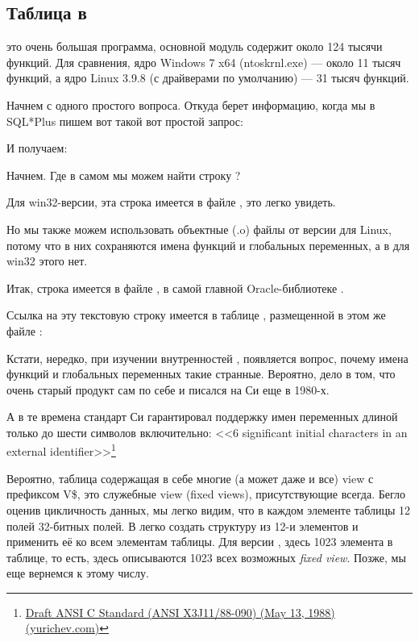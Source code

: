 \subsection{Таблица  в \oracle}

\myindex{\oracle}
 это очень большая программа, основной модуль  содержит около 124 тысячи функций. Для сравнения, ядро Windows 7 x64 (ntoskrnl.exe) --- около 11 тысяч функций, а ядро Linux 3.9.8 (с драйверами по умолчанию) --- 31 тысяч функций.

Начнем с одного простого вопроса. Откуда \oracle берет информацию, когда мы в SQL*Plus пишем вот такой вот простой запрос:



И получаем:



Начнем. Где в самом \oracle мы можем найти строку ?

Для win32-версии, эта строка имеется в файле , это легко увидеть.

Но мы также можем использовать объектные (.o) файлы от версии \oracle для Linux, потому что в них сохраняются имена функций и глобальных переменных, а в  для win32 этого нет.

Итак, строка  имеется в файле , в самой главной Oracle-библиотеке .

Ссылка на эту текстовую строку имеется в таблице , размещенной в этом же файле :



Кстати, нередко, при изучении внутренностей \oracle, появляется вопрос, почему имена функций и глобальных переменных такие странные.
Вероятно, дело в том, что \oracle очень старый продукт сам по себе и писался на Си еще в 1980-х.

А в те времена стандарт Си гарантировал поддержку имен переменных длиной только до шести символов включительно:
<<6 significant initial characters in an external identifier>>\footnote{\href{http://go.yurichev.com/17142}{Draft ANSI C Standard (ANSI X3J11/88-090) (May 13, 1988) (yurichev.com)}}

Вероятно, таблица  содержащая в себе многие (а может даже и все) view с префиксом V\$, это служебные view (fixed views), присутствующие всегда.
Бегло оценив цикличность данных, мы легко видим, что в каждом элементе таблицы  12 полей 32-битных полей.
В \IDA легко создать структуру из 12-и элементов и применить её ко всем элементам таблицы.
Для версии , здесь 1023 элемента в таблице, то есть, здесь описываются 1023 всех возможных \emph{fixed view}.
Позже, мы еще вернемся к этому числу.

